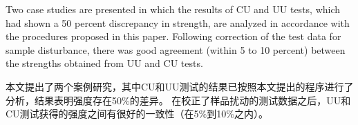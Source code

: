 \documentclass{myarticle}
\begin{document}
\begin{paracol}{2}
    \switchcolumn*

    Two case studies are presented in which the results of CU and UU tests, which had shown a 50 percent discrepancy in strength, are analyzed in accordance with the procedures proposed in this paper. Following correction of the test data for sample disturbance, there was good agreement (within 5 to 10 percent) between the strengths obtained from UU and CU tests.

    \switchcolumn
        
    本文提出了两个案例研究，其中CU和UU测试的结果已按照本文提出的程序进行了分析，结果表明强度存在50$\%$的差异。 在校正了样品扰动的测试数据之后，UU和CU测试获得的强度之间有很好的一致性（在5$\%$到10$\%$之内）。

\end{paracol}
\vspace{10pt}













\end{document}
